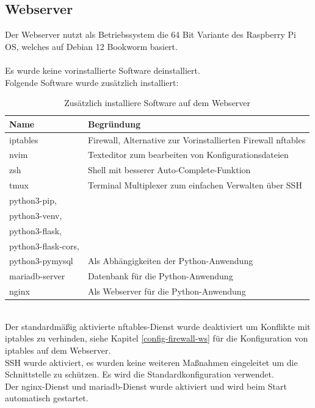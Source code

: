 \documentclass[
    a4paper,
    pagesize,
	pdftex,
    12pt,
]{scrartcl}
\begin{document}
\subsection{Webserver}
Der Webserver nutzt als Betriebssystem die 64 Bit Variante des Raspberry Pi OS, welches auf Debian 12 Bookworm basiert. \\ \\ 
Es wurde keine vorinstallierte Software deinstalliert.\\
Folgende Software wurde zusätzlich installiert: 
\begin{table}[h!]
	\begin{center}
		\label{tab:table2}
		\begin{tabular}{l|l }
			\textbf{Name} & \textbf{Begründung} \\
			\hline
			iptables & Firewall, Alternative zur Vorinstallierten Firewall nftables \\
			nvim & Texteditor zum bearbeiten von Konfigurationsdateien \\
			zsh & Shell mit besserer Auto-Complete-Funktion \\
			tmux & Terminal Multiplexer zum einfachen Verwalten über SSH \\
			python3-pip,\\ python3-venv, \\ python3-flask,\\ python3-flask-cors, \\ python3-pymysql & Als Abhängigkeiten der Python-Anwendung \\
			mariadb-server & Datenbank für die Python-Anwendung \\
			nginx & Als Webserver für die Python-Anwendung \\
		\end{tabular}
		\caption{Zusätzlich installiere Software auf dem Webserver}
	\end{center}
\end{table}
\\
Der standardmäßig aktivierte nftables-Dienst wurde deaktiviert um Konflikte mit iptables zu verhinden, siehe Kapitel \ref{config-firewall-ws} für die Konfiguration von iptables auf dem Webserver. \\
SSH wurde aktiviert, es wurden keine weiteren Maßnahmen eingeleitet um die Schnittstelle zu  schützen. Es wird die Standardkonfiguration verwendet. \\
Der nginx-Dienst und mariadb-Dienst wurde aktiviert und wird beim Start automatisch gestartet. \\
\end{document}
